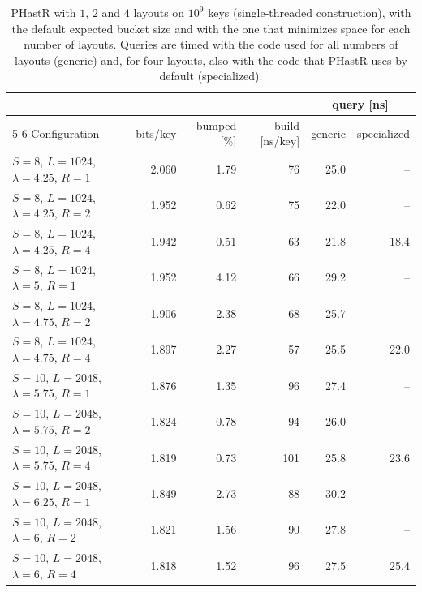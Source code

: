 \documentclass[11pt]{article}
\newcommand{\PHastR}{PHastR\xspace}
\begin{document}
\begin{table}[t]
\centering
\caption{\PHastR with $1$, $2$ and $4$ layouts on $10^9$ keys
(single-threaded construction), with the default expected bucket size and
with the one that minimizes space for each number of layouts. Queries are
timed with the code used for all numbers of layouts (generic) and, for four
layouts, also with the code that \PHastR uses by default (specialized).}
\label{tab:layouts}
\small
\begin{tabular}{lrrrrr}
\toprule
& & & & \multicolumn{2}{c}{query [ns]} \\
\cmidrule(lr){5-6}
Configuration & bits/key & bumped [\%] & build [ns/key] & generic & specialized \\
\midrule
$S=8$, $L=1024$, $\lambda=4.25$, $R=1$ & 2.060 & 1.79 & 76 & 25.0 & -- \\
$S=8$, $L=1024$, $\lambda=4.25$, $R=2$ & 1.952 & 0.62 & 75 & 22.0 & -- \\
$S=8$, $L=1024$, $\lambda=4.25$, $R=4$ & 1.942 & 0.51 & 63 & 21.8 & 18.4 \\
\addlinespace
$S=8$, $L=1024$, $\lambda=5$, $R=1$ & 1.952 & 4.12 & 66 & 29.2 & -- \\
$S=8$, $L=1024$, $\lambda=4.75$, $R=2$ & 1.906 & 2.38 & 68 & 25.7 & -- \\
$S=8$, $L=1024$, $\lambda=4.75$, $R=4$ & 1.897 & 2.27 & 57 & 25.5 & 22.0 \\
\midrule
$S=10$, $L=2048$, $\lambda=5.75$, $R=1$ & 1.876 & 1.35 & 96 & 27.4 & -- \\
$S=10$, $L=2048$, $\lambda=5.75$, $R=2$ & 1.824 & 0.78 & 94 & 26.0 & -- \\
$S=10$, $L=2048$, $\lambda=5.75$, $R=4$ & 1.819 & 0.73 & 101 & 25.8 & 23.6 \\
\addlinespace
$S=10$, $L=2048$, $\lambda=6.25$, $R=1$ & 1.849 & 2.73 & 88 & 30.2 & -- \\
$S=10$, $L=2048$, $\lambda=6$, $R=2$ & 1.821 & 1.56 & 90 & 27.8 & -- \\
$S=10$, $L=2048$, $\lambda=6$, $R=4$ & 1.818 & 1.52 & 96 & 27.5 & 25.4 \\
\bottomrule
\end{tabular}
\end{table}
\end{document}
